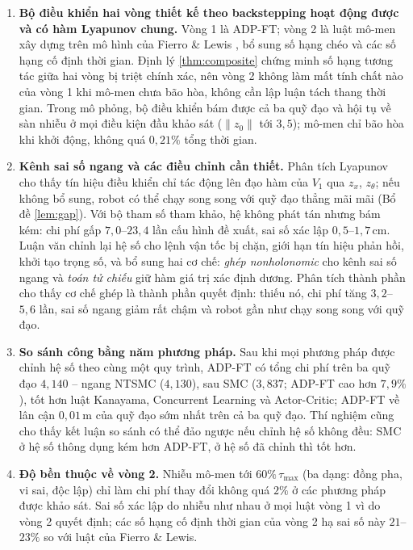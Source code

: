 \documentclass[12pt,a4paper]{article}
\begin{document}
\begin{enumerate}
    \item \textbf{Bộ điều khiển hai vòng thiết kế theo backstepping hoạt động được và có hàm Lyapunov chung.} Vòng 1 là ADP-FT; vòng 2 là luật mô-men xây dựng trên mô hình của Fierro \& Lewis \cite{Fierro1997}, bổ sung số hạng chéo và các số hạng cố định thời gian. Định lý \ref{thm:composite} chứng minh số hạng tương tác giữa hai vòng bị triệt chính xác, nên vòng 2 không làm mất tính chất nào của vòng 1 khi mô-men chưa bão hòa, không cần lập luận tách thang thời gian. Trong mô phỏng, bộ điều khiển bám được cả ba quỹ đạo và hội tụ về sàn nhiễu ở mọi điều kiện đầu khảo sát ($\|z_0\|$ tới $3{,}5$); mô-men chỉ bão hòa khi khởi động, không quá $0{,}21\%$ tổng thời gian.

    \item \textbf{Kênh sai số ngang và các điều chỉnh cần thiết.} Phân tích Lyapunov cho thấy tín hiệu điều khiển chỉ tác động lên đạo hàm của $V_1$ qua $z_x$, $z_\theta$; nếu không bổ sung, robot có thể chạy song song với quỹ đạo thẳng mãi mãi (Bổ đề \ref{lem:gap}). Với bộ tham số tham khảo, hệ không phát tán nhưng bám kém: chi phí gấp $7{,}0$--$23{,}4$ lần cấu hình đề xuất, sai số xác lập $0{,}5$--$1{,}7$\,cm. Luận văn chỉnh lại hệ số cho lệnh vận tốc bị chặn, giới hạn tín hiệu phản hồi, khởi tạo trọng số, và bổ sung hai cơ chế: \textit{ghép nonholonomic} cho kênh sai số ngang và \textit{toán tử chiếu} giữ hàm giá trị xác định dương. Phân tích thành phần cho thấy cơ chế ghép là thành phần quyết định: thiếu nó, chi phí tăng $3{,}2$--$5{,}6$ lần, sai số ngang giảm rất chậm và robot gần như chạy song song với quỹ đạo.

    \item \textbf{So sánh công bằng năm phương pháp.} Sau khi mọi phương pháp được chỉnh hệ số theo cùng một quy trình, ADP-FT có tổng chi phí trên ba quỹ đạo $4{,}140$ -- ngang NTSMC ($4{,}130$), sau SMC ($3{,}837$; ADP-FT cao hơn $7{,}9\%$), tốt hơn luật Kanayama, Concurrent Learning và Actor-Critic; ADP-FT về lân cận $0{,}01$\,m của quỹ đạo sớm nhất trên cả ba quỹ đạo. Thí nghiệm cũng cho thấy kết luận so sánh có thể đảo ngược nếu chỉnh hệ số không đều: SMC ở hệ số thông dụng kém hơn ADP-FT, ở hệ số đã chỉnh thì tốt hơn.

    \item \textbf{Độ bền thuộc về vòng 2.} Nhiễu mô-men tới $60\%\,\tau_\text{max}$ (ba dạng: đồng pha, vi sai, độc lập) chỉ làm chi phí thay đổi không quá $2\%$ ở các phương pháp được khảo sát. Sai số xác lập do nhiễu như nhau ở mọi luật vòng 1 vì do vòng 2 quyết định; các số hạng cố định thời gian của vòng 2 hạ sai số này $21$--$23\%$ so với luật của Fierro \& Lewis.

\end{enumerate}
\end{document}
